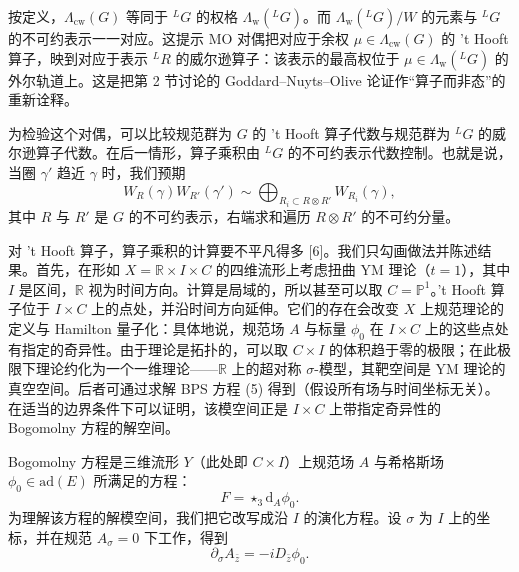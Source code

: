 \documentclass[11pt,a4paper,UTF8]{ctexart}
\begin{document}

按定义，$\Lambda_{\mathrm{cw}}(G)$ 等同于 ${}^{L}G$ 的权格 $\Lambda_{\mathrm{w}}({}^{L}G)$。而 $\Lambda_{\mathrm{w}}({}^{L}G)/W$ 的元素与 ${}^{L}G$ 的不可约表示一一对应。这提示 MO 对偶把对应于余权 $\mu\in\Lambda_{\mathrm{cw}}(G)$ 的 't Hooft 算子，映到对应于表示 ${}^{L}R$ 的威尔逊算子：该表示的最高权位于 $\mu\in\Lambda_{\mathrm{w}}({}^{L}G)$ 的外尔轨道上。这是把第 2 节讨论的 Goddard–Nuyts–Olive 论证作“算子而非态”的重新诠释。


为检验这个对偶，可以比较规范群为 $G$ 的 't Hooft 算子代数与规范群为 ${}^{L}G$ 的威尔逊算子代数。在后一情形，算子乘积由 ${}^{L}G$ 的不可约表示代数控制。也就是说，当圈 $\gamma'$ 趋近 $\gamma$ 时，我们预期
\[
    W_{R}(\gamma)W_{R'}(\gamma')\sim\bigoplus_{R_{i}\subset R\otimes R'}W_{R_{i}}(\gamma),
\]
其中 $R$ 与 $R'$ 是 $G$ 的不可约表示，右端求和遍历 $R\otimes R'$ 的不可约分量。

对 't Hooft 算子，算子乘积的计算要不平凡得多 [6]。我们只勾画做法并陈述结果。首先，在形如 $X=\mathbb{R}\times I\times C$ 的四维流形上考虑扭曲 YM 理论（$t=1$），其中 $I$ 是区间，$\mathbb{R}$ 视为时间方向。计算是局域的，所以甚至可以取 $C=\mathbb{P}^{1}$。't Hooft 算子位于 $I\times C$ 上的点处，并沿时间方向延伸。它们的存在会改变 $X$ 上规范理论的定义与 Hamilton 量子化：具体地说，规范场 $A$ 与标量 $\phi_{0}$ 在 $I\times C$ 上的这些点处有指定的奇异性。由于理论是拓扑的，可以取 $C\times I$ 的体积趋于零的极限；在此极限下理论约化为一个一维理论——$\mathbb{R}$ 上的超对称 $\sigma$-模型，其靶空间是 YM 理论的真空空间。后者可通过求解 BPS 方程 (5) 得到（假设所有场与时间坐标无关）。在适当的边界条件下可以证明，该模空间正是 $I\times C$ 上带指定奇异性的 Bogomolny 方程的解空间。


    Bogomolny 方程是三维流形 $Y$（此处即 $C\times I$）上规范场 $A$ 与希格斯场 $\phi_{0}\in\mathrm{ad}(E)$ 所满足的方程：
\[
    F=\star_{3}\mathrm{d}_{A}\phi_{0}.
\]
为理解该方程的解模空间，我们把它改写成沿 $I$ 的演化方程。设 $\sigma$ 为 $I$ 上的坐标，并在规范 $A_{\sigma}=0$ 下工作，得到
\[
    \partial_{\sigma}A_{\bar z}=-iD_{\bar z}\phi_{0}.
\]

\end{document}
